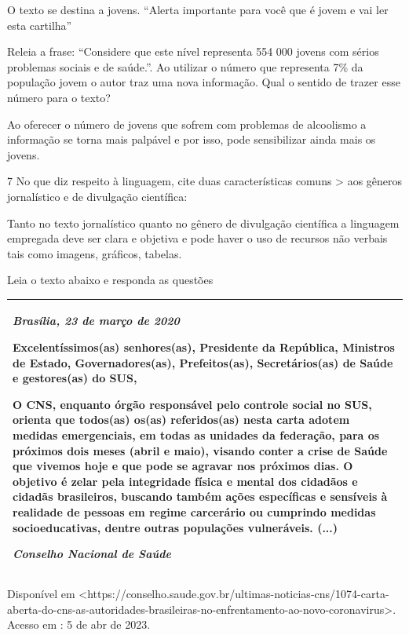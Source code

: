 {\begin{escolha}
O texto se destina a jovens. ``Alerta importante para você que é jovem e
vai ler esta cartilha''


  \item Releia a frase: ``Considere que este nível representa 554 000 jovens
  com sérios problemas sociais e de saúde.''. Ao utilizar o número que
  representa 7\% da população jovem o autor traz uma nova informação.
  Qual o sentido de trazer esse número para o texto?

\end{escolha}

Ao oferecer o número de jovens que sofrem com problemas de alcoolismo a
informação se torna mais palpável e por isso, pode sensibilizar ainda
mais os jovens.

\num{7} No que diz respeito à linguagem, cite duas características comuns \textgreater{} aos gêneros jornalístico e de divulgação científica:

Tanto no texto jornalístico quanto no gênero de divulgação científica a
linguagem empregada deve ser clara e objetiva e pode haver o uso de
recursos não verbais tais como imagens, gráficos, tabelas.

Leia o texto abaixo e responda as questões

\begin{longtable}[]{@{}
  >{\raggedright\arraybackslash}p{}@{}}
\toprule
\endhead
\emph{Brasília, 23 de março de 2020}

Excelentíssimos(as) senhores(as), Presidente da República, Ministros de
Estado, Governadores(as), Prefeitos(as), Secretários(as) de Saúde e
gestores(as) do SUS,

O CNS, enquanto órgão responsável pelo controle social no SUS, orienta
que todos(as) os(as) referidos(as) nesta carta adotem medidas
emergenciais, em todas as unidades da federação, para os próximos dois
meses (abril e maio), visando conter a crise de Saúde que vivemos hoje e
que pode se agravar nos próximos dias. O objetivo é zelar pela
integridade física e mental dos cidadãos e cidadãs brasileiros, buscando
também ações específicas e sensíveis à realidade de pessoas em regime
carcerário ou cumprindo medidas socioeducativas, dentre outras
populações vulneráveis. (...)

\emph{Conselho Nacional de Saúde} \\
\bottomrule
\end{longtable}

Disponível em
\textless https://conselho.saude.gov.br/ultimas-noticias-cns/1074-carta-aberta-do-cns-as-autoridades-brasileiras-no-enfrentamento-ao-novo-coronavirus\textgreater.
Acesso em : 5 de abr de 2023.

}

